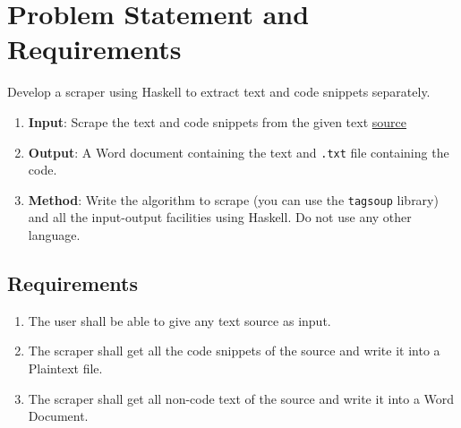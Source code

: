 \documentclass{scrreprt}
\begin{document}
\tableofcontents



\chapter{Problem Statement and Requirements}
\begin{tcolorbox}[colback=white,colframe=gray,title={Assigned Project Statement}]
    Develop a scraper using Haskell to extract text and code snippets separately.
    \begin{enumerate}
        \item \textbf{Input}: Scrape the text and code snippets from the given text \href{https://eli.thegreenplace.net/2018/type-erasure-and-reification/}{source}
        \item \textbf{Output}: A Word document containing the text and \texttt{.txt} file containing the code.
        \item \textbf{Method}: Write the algorithm to scrape (you can use the \texttt{tagsoup} library) and all the input-output facilities using Haskell. Do not use any other language.
    \end{enumerate}
\end{tcolorbox}




\section{Requirements}

\begin{enumerate}
    \item The user shall be able to give any text source as input.
    \item The scraper shall get all the code snippets of the source and write it into a Plaintext file.
    \item The scraper shall get all non-code text of the source and write it into a Word Document.
\end{enumerate}
\end{document}
